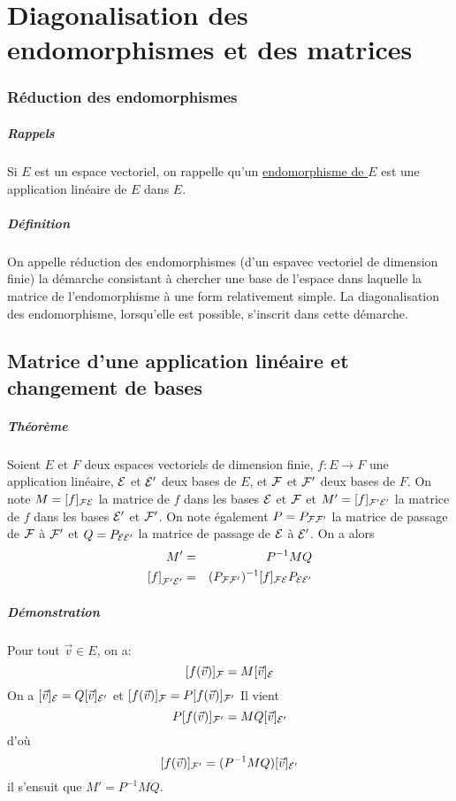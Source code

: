 \chapter{Diagonalisation des endomorphismes et des matrices}

%
\subsection{Réduction des endomorphismes}
%
\paragraph{Rappels} Si $E$ est un espace vectoriel, on rappelle qu'un \underline{endomorphisme de $E$} est une application linéaire de $E$ dans $E$.

\paragraph{Définition} On appelle réduction des endomorphismes (d'un espavec vectoriel de dimension finie) la démarche consistant à chercher une base de l'espace dans laquelle la matrice de l'endomorphisme à une form relativement simple. La diagonalisation des endomorphisme, lorsqu'elle est possible, s'inscrit dans cette démarche.

%
%
\section{Matrice d'une application linéaire et changement de bases}
%
%

\paragraph{Théorème} Soient $E$ et $F$ deux espaces vectoriels de dimension finie, $f: E \rightarrow F$ une application linéaire, $\mathcal{E}$ et $\mathcal{E}'$ deux bases de $E$, et $\mathcal{F}$ et $\mathcal{F}'$ deux bases de $F$. On note $M = [f]_{\mathcal{F} \mathcal{E}}$ la matrice de $f$ dans les bases $\mathcal{E}$ et $\mathcal{F}$ et $M' = [f]_{\mathcal{F}' \mathcal{E}'}$ la matrice de $f$ dans les bases $\mathcal{E}'$ et $\mathcal{F}'$. On note également $P = P_{\mathcal{F} \mathcal{F}'}$ la matrice de passage de $\mathcal{F}$ à $\mathcal{F}'$ et $Q = P_{\mathcal{E} \mathcal{E}'}$ la matrice de passage de $\mathcal{E}$ à $\mathcal{E}'$. On a alors 
\begin{eqnarray*}
  M' &=& P^{-1} M Q \\
  \left[f\right]_{\mathcal{F}' \mathcal{E}'} &=& (P_{\mathcal{F} \mathcal{F}'})^{-1} [f]_{\mathcal{F} \mathcal{E}} P_{\mathcal{E} \mathcal{E}'}
\end{eqnarray*}

\paragraph{Démonstration} Pour tout $\vec{v} \in E$, on a:
$$[f(\vec{v})]_{\mathcal{F}} = M [\vec{v}]_{\mathcal{E}}$$
On a $[\vec{v}]_{\mathcal{E}} = Q [\vec{v}]_{\mathcal{E}'}$ et $[f(\vec{v})]_{\mathcal{F}} = P [f(\vec{v})]_{\mathcal{F}'}$ Il vient 
$$P [f(\vec{v})]_{\mathcal{F}'} = M Q [\vec{v}]_{\mathcal{E}'}$$
d'où 
$$[f(\vec{v})]_{\mathcal{F}'} = (P^{-1} M Q ) [\vec{v}]_{\mathcal{E}'}$$
il s'ensuit que $M' = P^{-1} M Q$.

